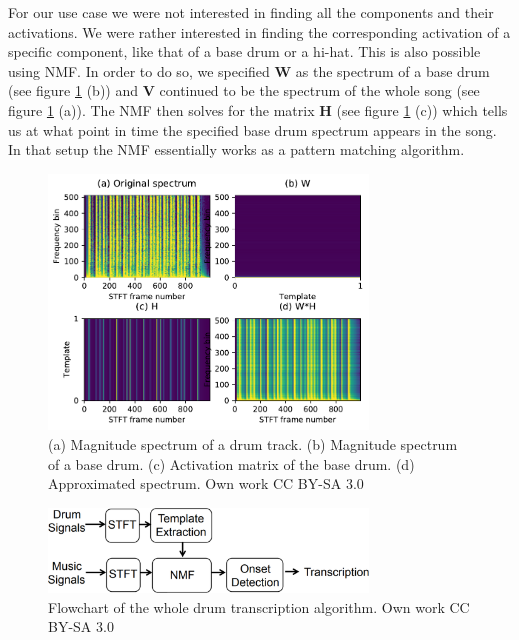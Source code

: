 \documentclass{article}
\begin{document}
For our use case we were not interested in finding all the components and their activations.
We were rather interested in finding the corresponding activation of a specific component, like that of a base drum or a hi-hat.
This is also possible using NMF.
In order to do so, we specified $\mathbf{W}$ as the spectrum of a base drum (see figure \ref{fig:MatrixOverview} (b)) and $\mathbf{V}$ continued to be the spectrum of the whole song (see figure \ref{fig:MatrixOverview} (a)).
The NMF then solves for the matrix $\mathbf{H}$ (see figure \ref{fig:MatrixOverview} (c)) which tells us at what point in time the specified base drum spectrum appears in the song.
In that setup the NMF essentially works as a pattern matching algorithm.

\begin{figure}[htb]

\begin{minipage}[b]{1.0\linewidth}
  \centering
  \centerline{\includegraphics[width=8.5cm]{figures/MatrixOverview}}
  \medskip
\end{minipage}

\caption{(a) Magnitude spectrum of a drum track. (b) Magnitude spectrum of a base drum. (c) Activation matrix of the base drum. (d) Approximated spectrum. \scriptsize{\textsf{\textcopyright} Own work CC BY-SA 3.0}}
\label{fig:MatrixOverview}

\end{figure}


\begin{figure}[htb]

\begin{minipage}[b]{1.0\linewidth}
  \centering
  \centerline{\includegraphics[width=8.5cm]{figures/Flowchart}}
  \medskip
\end{minipage}

\caption{Flowchart of the whole drum transcription algorithm. \scriptsize{\textsf{\textcopyright} Own work CC BY-SA 3.0}}
\label{fig:Flowchart}

\end{figure}
\end{document}

